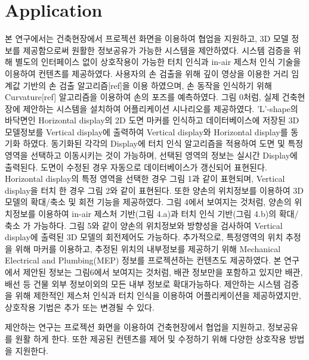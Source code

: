 
\section{Application}


본 연구에서는 건축현장에서 프로젝션 화면을 이용하여 협업을 지원하고, 3D 모델 정보를 제공함으로써 원활한 정보공유가 가능한 시스템을 제안하였다. 시스템 검증을 위해 별도의 인터페이스 없이 상호작용이 가능한 터치 인식과 in-air 제스처 인식 기술을 이용하여 컨텐츠를 제공하였다. 사용자의 손 검출을 위해 깊이 영상을 이용한 거리 임계값 기반의 손 검출 알고리즘[ref]을 이용 하였으며, 손 동작을 인식하기 위해 Curvature[ref] 알고리즘을 이용하여 손의 포즈를 예측하였다. 
그림 0처럼, 실제 건축현장에 제안하는 시스템을 설치하여 어플리케이션 시나리오를 제공하였다. 'L'-shape의 바닥면인 Horizontal display의 2D 도면 마커를 인식하고 데이터베이스에 저장된 3D 모델정보를 Vertical display에 출력하여 Vertical display와 Horizontal display를 동기화 하였다. 동기화된 각각의 Display에 터치 인식 알고리즘을 적용하여 도면 및 특정 영역을 선택하고 이동시키는 것이 가능하며, 선택된 영역의 정보는 실시간 Display에 출력된다. 도면이 수정된 경우 자동으로 데이터베이스가 갱신되어 표현된다.  Horizontal display의 특정 영역을 선택한 경우 그림 1과 같이 표현되며, Vertical display을 터치 한 경우 그림 2와 같이 표현된다. 또한 양손의 위치정보를 이용하여 3D 모델의 확대/축소 및 회전 기능을 제공하였다. 그림 4에서 보여지는 것처럼, 양손의 위치정보를 이용하여 in-air 제스처 기반(그림 4.a)과 터치 인식 기반(그림 4.b)의 확대/축소 가 가능하다. 그림 5와 같이 양손의 위치정보와 방향성을 검사하여 Vertical display에 출력된 3D 모델의 회전제어도 가능하다.
추가적으로, 특정영역의 위치 추정을 위해 마커를 이용하고, 추정된 위치의 내부정보를 제공하기 위해 Mechanical Electrical and Plumbing(MEP) 정보를 프로젝션하는 컨텐츠도 제공하였다. 본 연구에서 제안된 정보는 그림6에서 보여지는 것처럼, 배관 정보만을 포함하고 있지만 배관, 배선 등 건물 외부 정보이외의 모든 내부 정보로 확대가능하다. 
제안하는 시스템 검증을 위해 제한적인 제스처 인식과 터치 인식을 이용하여 어플리케이션을 제공하였지만, 상호작용 기법은 추가 또는 변경될 수 있다.  






제안하는 연구는 프로젝션 화면을 이용하여 건축현장에서 협업을 지원하고, 정보공유를 원활 하게 한다. 또한 제공된 컨텐츠를 제어 및 수정하기 위해 다양한 상호작용 방법을 지원한다. 
